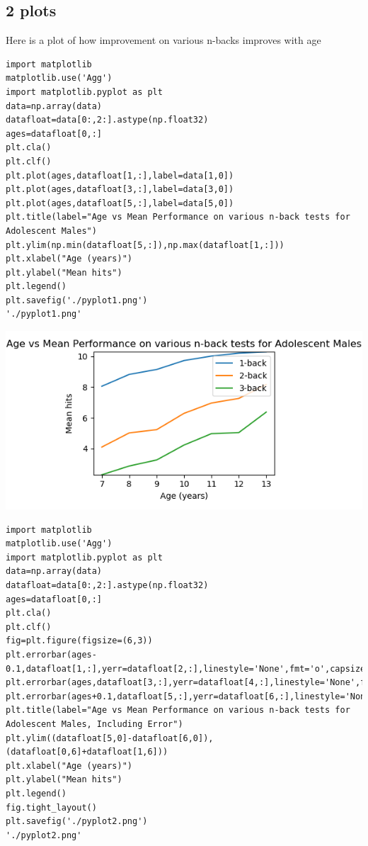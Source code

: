 \documentclass{article}
\begin{document}
\subsection{2 plots}
\label{sec:orgfb7e985}
Here is a plot of how improvement on various n-backs improves with age
\begin{verbatim}
import matplotlib
matplotlib.use('Agg')
import matplotlib.pyplot as plt
data=np.array(data)
datafloat=data[0:,2:].astype(np.float32)
ages=datafloat[0,:]
plt.cla()
plt.clf()
plt.plot(ages,datafloat[1,:],label=data[1,0])
plt.plot(ages,datafloat[3,:],label=data[3,0])
plt.plot(ages,datafloat[5,:],label=data[5,0])
plt.title(label="Age vs Mean Performance on various n-back tests for Adolescent Males")
plt.ylim(np.min(datafloat[5,:]),np.max(datafloat[1,:]))
plt.xlabel("Age (years)")
plt.ylabel("Mean hits")
plt.legend()
plt.savefig('./pyplot1.png')
'./pyplot1.png'

\end{verbatim}

\begin{center}
\includegraphics[width=.9\linewidth]{./pyplot1.png}
\end{center}

\begin{verbatim}
import matplotlib
matplotlib.use('Agg')
import matplotlib.pyplot as plt
data=np.array(data)
datafloat=data[0:,2:].astype(np.float32)
ages=datafloat[0,:]
plt.cla()
plt.clf()
fig=plt.figure(figsize=(6,3))
plt.errorbar(ages-0.1,datafloat[1,:],yerr=datafloat[2,:],linestyle='None',fmt='o',capsize=3,label=data[1,0])
plt.errorbar(ages,datafloat[3,:],yerr=datafloat[4,:],linestyle='None',fmt='v',capsize=3,label=data[3,0])
plt.errorbar(ages+0.1,datafloat[5,:],yerr=datafloat[6,:],linestyle='None',fmt='s',capsize=3,label=data[5,0])
plt.title(label="Age vs Mean Performance on various n-back tests for Adolescent Males, Including Error")
plt.ylim((datafloat[5,0]-datafloat[6,0]),(datafloat[0,6]+datafloat[1,6]))
plt.xlabel("Age (years)")
plt.ylabel("Mean hits")
plt.legend()
fig.tight_layout()
plt.savefig('./pyplot2.png')
'./pyplot2.png'
\end{verbatim}
\end{document}
